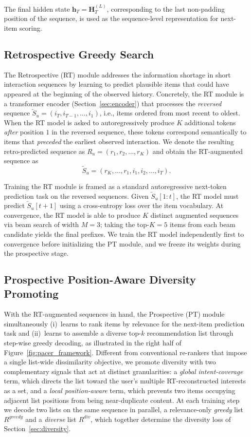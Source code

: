 The final hidden state $\mathbf{h}_T = \mathbf{H}^{(L)}_{T}$, corresponding to the last non-padding position of the sequence, is used as the sequence-level representation for next-item scoring.

\subsection{Retrospective Greedy Search}
\label{sec:rt}
The Retrospective (RT) module addresses the information shortage in short interaction sequences by learning to predict plausible items that could have appeared at the beginning of the observed history. Concretely, the RT module is a transformer encoder (Section~\ref{sec:encoder}) that processes the \emph{reversed} sequence $\overleftarrow{S}_u = (i_T, i_{T-1}, \dots, i_1)$, i.e., items ordered from most recent to oldest. When the RT model is asked to autoregressively produce $K$ additional tokens \emph{after} position $1$ in the reversed sequence, these tokens correspond semantically to items that \emph{preceded} the earliest observed interaction. We denote the resulting retro-predicted sequence as $R_u = (r_1, r_2, \dots, r_K)$ and obtain the RT-augmented sequence as
\begin{equation}
\widetilde{S}_u = (r_K, \dots, r_1, i_1, i_2, \dots, i_T).
\end{equation}

Training the RT module is framed as a standard autoregressive next-token prediction task on the reversed sequences. Given $\overleftarrow{S}_u[1:t]$, the RT model must predict $\overleftarrow{S}_u[t+1]$ using a cross-entropy loss over the item vocabulary. At convergence, the RT model is able to produce $K$ distinct augmented sequences via beam search of width $M=3$; taking the top-$K=5$ items from each beam candidate yields the final prefixes. We train the RT model independently first to convergence before initializing the PT module, and we freeze its weights during the prospective stage.

\subsection{Prospective Position-Aware Diversity Promoting}
\label{sec:pt}
With the RT-augmented sequences in hand, the Prospective (PT) module simultaneously (i)~learns to rank items by relevance for the next-item prediction task and (ii)~learns to assemble a diverse top-$k$ recommendation list through step-wise greedy decoding, as illustrated in the right half of Figure~\ref{fig:pacer_framework}. Different from conventional re-rankers that impose a single list-wide dissimilarity objective, we promote diversity with two complementary signals that act at distinct granularities: a \emph{global intent-coverage} term, which directs the list toward the user's multiple RT-reconstructed interests as a set, and a \emph{local position-aware} term, which prevents two items occupying adjacent list positions from being near-duplicate content. At each training step we decode two lists on the same sequence in parallel, a relevance-only \emph{greedy} list $R^{greedy}$ and a \emph{diverse} list $R^{div}$, which together determine the diversity loss of Section~\ref{sec:diversity}.

